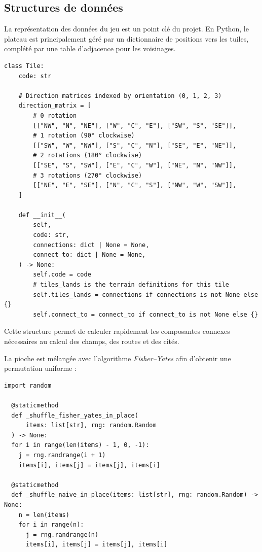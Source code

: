 \documentclass[11pt]{article}
\begin{document}
\subsection{Structures de données}

La représentation des données du jeu est un point clé du projet. En Python, le plateau est principalement géré par un dictionnaire de positions vers les tuiles, complété par une table d’adjacence pour les voisinages.

{\normalsize
  \begin{verbatim}
class Tile:
    code: str

    # Direction matrices indexed by orientation (0, 1, 2, 3)
    direction_matrix = [
        # 0 rotation
        [["NW", "N", "NE"], ["W", "C", "E"], ["SW", "S", "SE"]],
        # 1 rotation (90° clockwise)
        [["SW", "W", "NW"], ["S", "C", "N"], ["SE", "E", "NE"]],
        # 2 rotations (180° clockwise)
        [["SE", "S", "SW"], ["E", "C", "W"], ["NE", "N", "NW"]],
        # 3 rotations (270° clockwise)
        [["NE", "E", "SE"], ["N", "C", "S"], ["NW", "W", "SW"]],
    ]

    def __init__(
        self,
        code: str,
        connections: dict | None = None,
        connect_to: dict | None = None,
    ) -> None:
        self.code = code
        # tiles_lands is the terrain definitions for this tile
        self.tiles_lands = connections if connections is not None else {}
        self.connect_to = connect_to if connect_to is not None else {}
  \end{verbatim}
}

Cette structure permet de calculer rapidement les composantes connexes nécessaires au calcul des champs, des routes et des cités.

La pioche est mélangée avec l’algorithme \textit{Fisher–Yates}\cite{fisher_yates} afin d’obtenir une permutation uniforme :

{\normalsize
  \begin{verbatim}
import random

  @staticmethod
  def _shuffle_fisher_yates_in_place(
      items: list[str], rng: random.Random
  ) -> None:
  for i in range(len(items) - 1, 0, -1):
    j = rng.randrange(i + 1)
    items[i], items[j] = items[j], items[i]

  @staticmethod
  def _shuffle_naive_in_place(items: list[str], rng: random.Random) -> None:
    n = len(items)
    for i in range(n):
      j = rng.randrange(n)
      items[i], items[j] = items[j], items[i]
  
  \end{verbatim}
}
\end{document}
